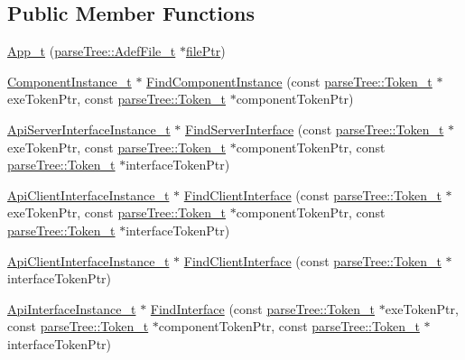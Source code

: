 \subsection*{Public Member Functions}
\begin{DoxyCompactItemize}
\item 
\hyperlink{struct_app__t_a44d5873d26d4ae2f124c11c34b3ced34}{App\+\_\+t} (\hyperlink{structparse_tree_1_1_adef_file__t}{parse\+Tree\+::\+Adef\+File\+\_\+t} $\ast$\hyperlink{struct_content__t_a5a292ff88ad990d4dd6a04f10239d7a9}{file\+Ptr})
\item 
\hyperlink{struct_component_instance__t}{Component\+Instance\+\_\+t} $\ast$ \hyperlink{struct_app__t_a271bd0144a63a799d2f69f16496ab3bb}{Find\+Component\+Instance} (const \hyperlink{structparse_tree_1_1_token__t}{parse\+Tree\+::\+Token\+\_\+t} $\ast$exe\+Token\+Ptr, const \hyperlink{structparse_tree_1_1_token__t}{parse\+Tree\+::\+Token\+\_\+t} $\ast$component\+Token\+Ptr)
\item 
\hyperlink{struct_api_server_interface_instance__t}{Api\+Server\+Interface\+Instance\+\_\+t} $\ast$ \hyperlink{struct_app__t_a9a1e31d8ee008c522e3091e1febea620}{Find\+Server\+Interface} (const \hyperlink{structparse_tree_1_1_token__t}{parse\+Tree\+::\+Token\+\_\+t} $\ast$exe\+Token\+Ptr, const \hyperlink{structparse_tree_1_1_token__t}{parse\+Tree\+::\+Token\+\_\+t} $\ast$component\+Token\+Ptr, const \hyperlink{structparse_tree_1_1_token__t}{parse\+Tree\+::\+Token\+\_\+t} $\ast$interface\+Token\+Ptr)
\item 
\hyperlink{struct_api_client_interface_instance__t}{Api\+Client\+Interface\+Instance\+\_\+t} $\ast$ \hyperlink{struct_app__t_afaecb400f46e1ecc239210669ce2e49c}{Find\+Client\+Interface} (const \hyperlink{structparse_tree_1_1_token__t}{parse\+Tree\+::\+Token\+\_\+t} $\ast$exe\+Token\+Ptr, const \hyperlink{structparse_tree_1_1_token__t}{parse\+Tree\+::\+Token\+\_\+t} $\ast$component\+Token\+Ptr, const \hyperlink{structparse_tree_1_1_token__t}{parse\+Tree\+::\+Token\+\_\+t} $\ast$interface\+Token\+Ptr)
\item 
\hyperlink{struct_api_client_interface_instance__t}{Api\+Client\+Interface\+Instance\+\_\+t} $\ast$ \hyperlink{struct_app__t_a001d9124d4c62bfb490e316aab61f8c9}{Find\+Client\+Interface} (const \hyperlink{structparse_tree_1_1_token__t}{parse\+Tree\+::\+Token\+\_\+t} $\ast$interface\+Token\+Ptr)
\item 
\hyperlink{struct_api_interface_instance__t}{Api\+Interface\+Instance\+\_\+t} $\ast$ \hyperlink{struct_app__t_aeacda6a6017a8a16e2ff4950743e12bc}{Find\+Interface} (const \hyperlink{structparse_tree_1_1_token__t}{parse\+Tree\+::\+Token\+\_\+t} $\ast$exe\+Token\+Ptr, const \hyperlink{structparse_tree_1_1_token__t}{parse\+Tree\+::\+Token\+\_\+t} $\ast$component\+Token\+Ptr, const \hyperlink{structparse_tree_1_1_token__t}{parse\+Tree\+::\+Token\+\_\+t} $\ast$interface\+Token\+Ptr)

\end{DoxyCompactItemize}
